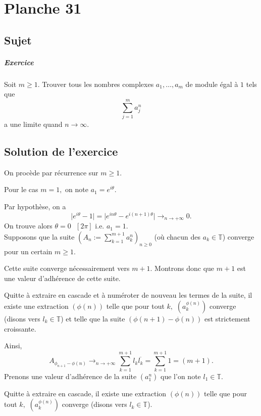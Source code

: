 \chapter{Planche 31}

\section{Sujet}

\paragraph{Exercice}
Soit $m \geqslant 1$. Trouver tous les nombres complexes $a_1,\dots,a_m$ de module égal à $1$ tels que
\[
\sum_{j=1}^m a_j^n
\]
a une limite quand $n \to \infty$.


\section{Solution de l'exercice}

 On procède par récurrence sur $m\geq 1.$
 
Pour le cas $m=1,$ on note $a_{1}=e^{i\theta}.$

Par hypothèse, on a $$\vert e^{i\theta}-1\vert =\vert e^{in\theta}-e^{i(n+1)\theta}\vert \longrightarrow_{n\rightarrow +\infty} 0.$$ On trouve alors $\theta=0\mbox{ }[2\pi]$ i.e. $a_{1}=1.$\\


Supposons que la suite $\displaystyle\left(A_{n}:=\sum_{k=1}^{m+1}a_{k}^{n}\right)_{n\geq 0}$ (où chacun des $a_{k}\in\mathbb{T}$) converge pour un certain $m\geq 1.$

Cette suite converge nécessairement vers $m+1.$ Montrons donc que $m+1$ est une valeur d'adhérence de cette suite.

Quitte à extraire en cascade et à numéroter de nouveau les termes de la suite, il existe une extraction $(\phi(n))$ telle que pour tout $k,$ $(a_{k}^{\phi(n)})$ converge (disons vers $l_{k}\in\mathbb{T}$) et telle que la suite $(\phi(n+1)-\phi(n))$ est strictement croissante.

Ainsi, $$A_{\phi_{n+1}-\phi(n)}\longrightarrow_{n\rightarrow +\infty} \sum_{k=1}^{m+1}l_{k}\overline{l_{k}}=\sum_{k=1}^{m+1}1=(m+1).$$ 
Prenons une valeur d'adhérence de la suite $(a_{1}^{n})$ que l'on note $l_{1}\in\mathbb{T}.$

Quitte à extraire en cascade, il existe une extraction $(\phi(n))$ telle que pour tout $k,$ $(a_{k}^{\phi(n)})$ converge (disons vers $l_{k}\in\mathbb{T}$).

